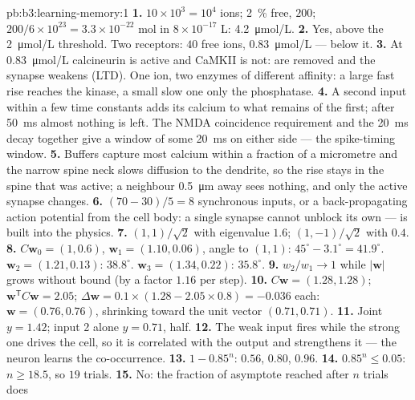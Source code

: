 \begin{solution}{pb:b3:learning-memory:1}
\textbf{1.} $10\times 10^{3} = 10^{4}$ ions; \qty{2}{\%} free, $200$;
$200/6\times 10^{23} = 3.3\times 10^{-22}$ mol in $8\times 10^{-17}$ L:
\qty{4.2}{\micro mol/L}.
\textbf{2.} Yes, above the \qty{2}{\micro mol/L} threshold. Two
receptors: $40$ free ions, \qty{0.83}{\micro mol/L} --- below it.
\textbf{3.} At \qty{0.83}{\micro mol/L} calcineurin is active and CaMKII
is not:  are removed and the synapse weakens (LTD). One
ion, two enzymes of different affinity: a large fast rise reaches the
kinase, a small slow one only the phosphatase.
\textbf{4.} A second input within a few time constants adds its calcium
to what remains of the first; after \qty{50}{ms} almost nothing is
left. The NMDA coincidence requirement and the \qty{20}{ms} decay
together give a window of some \qty{20}{ms} on either side --- the
spike-timing window.
\textbf{5.} Buffers capture most calcium within a fraction of a
micrometre and the narrow spine neck slows diffusion to the dendrite,
so the rise stays in the spine that was active; a neighbour
\qty{0.5}{\micro m} away sees nothing, and only the active synapse
changes.
\textbf{6.} $(70 - 30)/5 = 8$ synchronous inputs, or a back-propagating
action potential from the cell body: a single synapse cannot unblock
its own  ---  is built into the physics.
\textbf{7.} $(1,1)/\sqrt{2}$ with eigenvalue $1.6$; $(1,-1)/\sqrt{2}$
with $0.4$.
\textbf{8.} $C\mathbf{w}_{0} = (1, 0.6)$, $\mathbf{w}_{1} = (1.10,
0.06)$, angle to $(1,1)$: $45^{\circ} - 3.1^{\circ} = 41.9^{\circ}$.
$\mathbf{w}_{2} = (1.21, 0.13)$: $38.8^{\circ}$. $\mathbf{w}_{3} = (1.34,
0.22)$: $35.8^{\circ}$.
\textbf{9.} $w_{2}/w_{1} \to 1$ while $|\mathbf{w}|$ grows without bound
(by a factor $1.16$ per step).
\textbf{10.} $C\mathbf{w} = (1.28, 1.28)$; $\mathbf{w}^{\mathsf{T}}C
\mathbf{w} = 2.05$; $\Delta\mathbf{w} = 0.1\times(1.28 - 2.05\times 0.8)
= -0.036$ each: $\mathbf{w} = (0.76, 0.76)$, shrinking toward the unit
vector $(0.71, 0.71)$.
\textbf{11.} Joint $y = 1.42$; input 2 alone $y = 0.71$, half.
\textbf{12.} The weak input fires while the strong one drives the cell,
so it is correlated with the output and  strengthens it ---
the neuron learns the co-occurrence.
\textbf{13.} $1 - 0.85^{n}$: $0.56$, $0.80$, $0.96$.
\textbf{14.} $0.85^{n} \le 0.05$: $n \ge 18.5$, so $19$ trials.
\textbf{15.} No: the fraction of asymptote reached after $n$ trials does

\end{solution}

